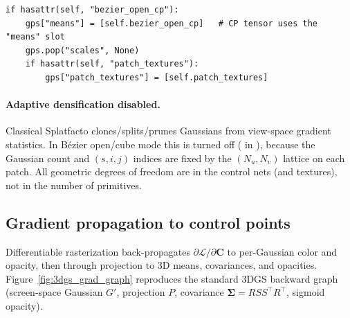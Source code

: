 \begin{lstlisting}[caption={Open/cube B\'ezier parameter groups (\filepath{splatfacto.py}).},label={lst:param_groups}]
if hasattr(self, "bezier_open_cp"):
    gps["means"] = [self.bezier_open_cp]   # CP tensor uses the "means" slot
    gps.pop("scales", None)
    if hasattr(self, "patch_textures"):
        gps["patch_textures"] = [self.patch_textures]
\end{lstlisting}

\paragraph{Adaptive densification disabled.}
Classical Splatfacto clones/splits/prunes Gaussians from view-space gradient statistics. In B\'ezier open/cube mode this is turned off ( in ), because the Gaussian count and $(s,i,j)$ indices are fixed by the $(N_u,N_v)$ lattice on each patch. All geometric degrees of freedom are in the control nets (and textures), not in the number of primitives.

\subsection{Gradient propagation to control points}
\label{subsec:bezier_gradients}

Differentiable rasterization \cite{kerbl2023gaussian} back-propagates $\partial\mathcal{L}/\partial\mathbf{C}$ to per-Gaussian color and opacity, then through projection to 3D means, covariances, and opacities. Figure~\ref{fig:3dgs_grad_graph} reproduces the standard 3DGS backward graph (screen-space Gaussian $G'$, projection $P$, covariance $\boldsymbol{\Sigma}=RSS^\top R^\top$, sigmoid opacity).

